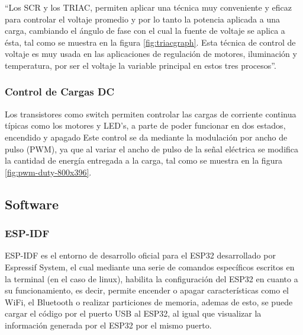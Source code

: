 ``Los SCR y los TRIAC, permiten aplicar una técnica muy conveniente y eficaz para controlar el voltaje promedio y por lo tanto la potencia aplicada a una carga, cambiando el ángulo de fase con el cual la fuente de voltaje se aplica a ésta, tal como se muestra en la figura \ref{fig:triacgraph}. Esta técnica de control de voltaje es muy usada en las aplicaciones de regulación de motores, iluminación y temperatura, por ser el voltaje la variable principal en estos tres procesos''.\cite{CEKIT}\\



\subsubsection{Control de Cargas DC}

Los transistores como switch permiten controlar las cargas de corriente continua típicas como los motores y LED's, a parte de poder funcionar en dos estados, encendido y apagado Este control se da mediante la modulación por ancho de pulso (PWM), ya que al variar el ancho de pulso de la señal eléctrica se modifica la cantidad de energía entregada a la carga, tal como se muestra en la figura \ref{fig:pwm-duty-800x396}. \cite{PWM}\\


\subsection{Software}

\subsubsection{ESP-IDF}

ESP-IDF es el entorno de desarrollo oficial para el ESP32 desarrollado por Espressif System, el cual mediante una serie de comandos específicos escritos en la terminal (en el caso de linux), habilita la configuración del ESP32 en cuanto a su funcionamiento, es decir, permite encender o apagar características como el WiFi, el Bluetooth o realizar particiones de memoria, ademas de esto, se puede cargar el código por el puerto USB al ESP32, al igual que visualizar la información generada por el ESP32 por el mismo puerto. \cite{ES}\\